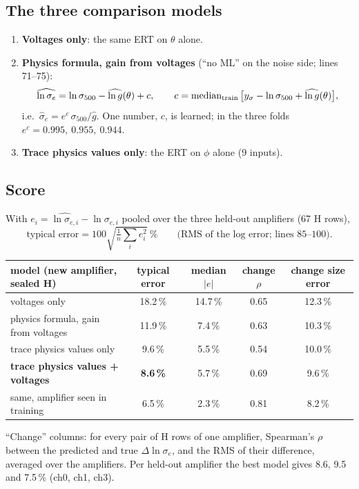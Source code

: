 \documentclass[10pt,a4paper]{article}
\newcommand{\med}{\operatorname{median}}
\begin{document}
\subsection{The three comparison models}
\begin{enumerate}
\item \textbf{Voltages only}: the same ERT on $\theta$ alone.
\item \textbf{Physics formula, gain from voltages} (``no ML'' on the noise side; lines 71--75):
\begin{equation}
\widehat{\ln\sigma_e}=\ln\sigma_{500}-\widehat{\ln g}(\theta)+c,\qquad
c=\med_{\rm train}\big[y_\sigma-\ln\sigma_{500}+\widehat{\ln g}(\theta)\big],
\end{equation}
i.e.\ $\hat\sigma_e=e^c\,\sigma_{500}/\hat g$. One number, $c$, is learned; in the three folds $e^c=0.995,\ 0.955,\ 0.944$.
\item \textbf{Trace physics values only}: the ERT on $\phi$ alone (9 inputs).
\end{enumerate}

\subsection{Score}
With $e_i=\widehat{\ln\sigma_{e,i}}-\ln\sigma_{e,i}$ pooled over the three held-out amplifiers (67 H rows),
\begin{equation}
\text{typical error}=100\sqrt{\tfrac1n\textstyle\sum_i e_i^2}\ \%\qquad\text{(RMS of the log error; lines 85--100).}
\end{equation}

\begin{center}\small
\begin{tabular}{lcccc}\toprule
model (new amplifier, sealed H) & typical error & median $|e|$ & change $\rho$ & change size error\\\midrule
voltages only & 18.2\,\% & 14.7\,\% & 0.65 & 12.3\,\%\\
physics formula, gain from voltages & 11.9\,\% & 7.4\,\% & 0.63 & 10.3\,\%\\
trace physics values only & 9.6\,\% & 5.5\,\% & 0.54 & 10.0\,\%\\
\textbf{trace physics values + voltages} & \textbf{8.6\,\%} & 5.7\,\% & 0.69 & 9.6\,\%\\\midrule
same, amplifier seen in training & 6.5\,\% & 2.3\,\% & 0.81 & 8.2\,\%\\\bottomrule
\end{tabular}
\end{center}
``Change'' columns: for every pair of H rows of one amplifier, Spearman's $\rho$ \cite{spearman1904} between the predicted and true
$\Delta\ln\sigma_e$, and the RMS of their difference, averaged over the amplifiers. Per held-out amplifier the best model
gives 8.6, 9.5 and 7.5\,\% (ch0, ch1, ch3).
\end{document}

